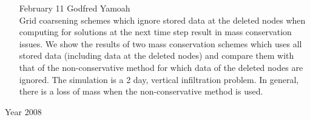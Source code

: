 \documentclass[12]{article}
\begin{document}
\begin{enumerate}
\item[February 11] Godfred Yamoah\\
  Grid coarsening schemes which ignore stored data at the deleted nodes when
computing for solutions at the next time step result in mass conservation
issues. We show the results of two mass conservation schemes which uses all
stored data (including data at the deleted nodes) and compare them with that
of the non-conservative method for which data of the deleted nodes are
ignored. The simulation is a 2 day, vertical infiltration problem. In
general, there is a loss of mass when the non-conservative method is used.

\end{enumerate}

\begin{center}
\Large
Year 2008
\end{center}
\end{document}
